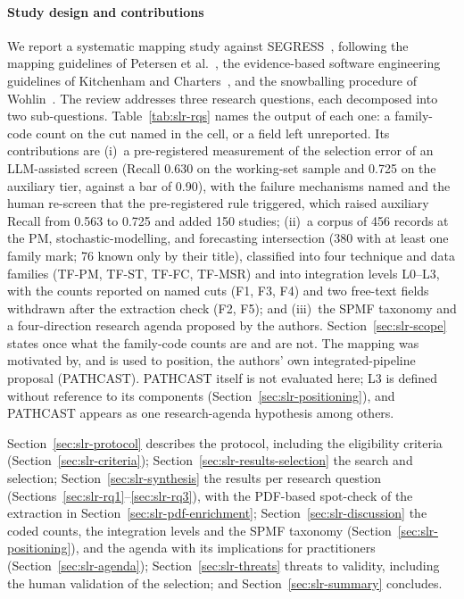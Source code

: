 \paragraph{Study design and contributions} We report a systematic mapping
study against SEGRESS~\cite{kitchenham2023segress}, following the mapping
guidelines of Petersen et al.~\cite{petersen2015}, the evidence-based software
engineering guidelines of Kitchenham and Charters~\cite{kitchenham2007}, and
the snowballing procedure of Wohlin~\cite{Wohlin2014}. The review addresses
three research questions, each decomposed into two sub-questions.
Table~\ref{tab:slr-rqs} names the output of each one: a family-code
count on the cut named in the cell, or a field left unreported.
Its contributions are (i)~a pre-registered measurement of the selection
error of an LLM-assisted screen (Recall 0.630 on the working-set sample
and 0.725 on the auxiliary tier, against a bar of 0.90), with the
failure mechanisms named and the human re-screen that the
pre-registered rule triggered, which raised auxiliary Recall from 0.563 to
0.725 and added 150 studies;
(ii)~a corpus of 456 records at the PM, stochastic-modelling, and
forecasting intersection (380 with at least one family mark; 76 known
only by their title), classified into four technique and data
families (TF-PM, TF-ST, TF-FC, TF-MSR) and into integration levels
L0--L3, with the counts reported on named cuts (F1, F3, F4) and two
free-text fields withdrawn after the extraction check (F2, F5); and
(iii)~the SPMF taxonomy and a four-direction research agenda proposed by
the authors. Section~\ref{sec:slr-scope} states once what the family-code
counts are and are not. The mapping was motivated by, and is used to position, the authors'
own integrated-pipeline proposal (PATHCAST). PATHCAST itself is not
evaluated here; L3 is defined without reference to its components
(Section~\ref{sec:slr-positioning}), and PATHCAST appears as one
research-agenda hypothesis among others.

Section~\ref{sec:slr-protocol} describes the protocol, including the
eligibility criteria (Section~\ref{sec:slr-criteria});
Section~\ref{sec:slr-results-selection} the search and selection;
Section~\ref{sec:slr-synthesis} the results per research question
(Sections~\ref{sec:slr-rq1}--\ref{sec:slr-rq3}), with the PDF-based
spot-check of the extraction in Section~\ref{sec:slr-pdf-enrichment};
Section~\ref{sec:slr-discussion} the coded counts, the integration
levels and the SPMF taxonomy (Section~\ref{sec:slr-positioning}), and the
agenda with its implications for practitioners
(Section~\ref{sec:slr-agenda});
Section~\ref{sec:slr-threats} threats to validity, including the human
validation of the selection; and Section~\ref{sec:slr-summary} concludes.


